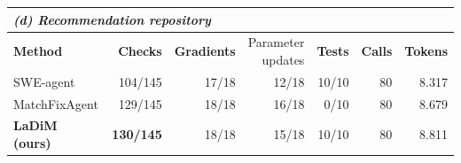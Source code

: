 \par\vspace{5pt}
\begin{tabular*}{\linewidth}{@{\extracolsep{\fill}}lrrrrrr@{}}
\toprule
\multicolumn{7}{l}{\textit{(d) Recommendation repository}} \\
\midrule
\textbf{Method} & \textbf{Checks} & \textbf{Gradients} & \thead{Parameter\\updates} & \textbf{Tests} & \textbf{Calls} & \textbf{Tokens} \\
\midrule
SWE-agent & 104/145 & 17/18 & 12/18 & 10/10 & 80 & 8.317 \\
MatchFixAgent & 129/145 & 18/18 & 16/18 & 0/10 & 80 & 8.679 \\
\textbf{LaDiM (ours)} & \textbf{130/145} & 18/18 & 15/18 & 10/10 & 80 & 8.811 \\
\bottomrule
\end{tabular*}
